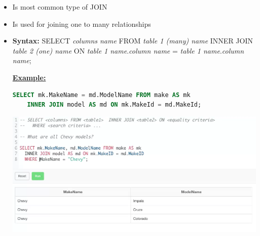 \documentclass[12pt]{article}
\begin{document}
\bigskip

\begin{itemize}
    \item Is most common type of JOIN
    \item Is used for joining one to many relationships
    \item \textbf{Syntax:} SELECT \textit{columns name} FROM \textit{table 1 (many) name}
    INNER JOIN \textit{table 2 (one) name} ON \textit{table 1 name}.\textit{column name} = \textit{table 1 name}.\textit{column name};

    \bigskip

    \underline{\textbf{Example:}}

    \bigskip

    \begin{lstlisting}[language=SQL]
    SELECT mk.MakeName = md.ModelName FROM make AS mk
    INNER JOIN model AS md ON mk.MakeId = md.MakeId;
    \end{lstlisting}

    \bigskip

    \begin{center}
    \includegraphics[width=0.8\linewidth]{images/part_4_notes_2.png}
    \end{center}
\end{itemize}
\end{document}
